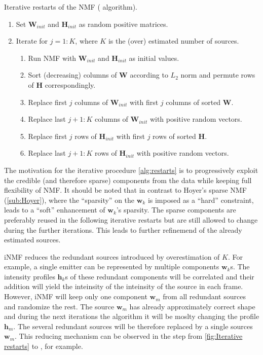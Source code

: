 \begin{algorithm}[hbt]
	\caption{Iterative restarts of the NMF (\inmf{} algorithm).}	
	\label{alg:restarts}
	\begin{enumerate}
		\item Set $\bm{W}_{init}$ and $\bm{H}_{init}$ as random positive matrices.
		\item Iterate for $j=1:K$, where $K$ is the (over) estimated number of sources.
		\begin{enumerate}
			\item Run NMF with $\bm{W}_{init}$ and $\bm{H}_{init}$ as initial values.
			\item Sort (decreasing) columns of $\bm{W}$ according to  $L_2$ norm and permute rows of $\bm{H}$ correspondingly.
			\item Replace first $j$ columns of $\bm{W}_{init}$ with first $j$ columns of sorted $\bm{W}$.
			\item Replace last $j+1:K$ columns of $\bm{W}_{init}$ with positive random vectors.
			\item Replace first $j$ rows of $\bm{H}_{init}$ with first $j$ rows of sorted $\bm{H}$.
			\item Replace last $j+1:K$ rows of $\bm{H}_{init}$ with positive random vectors.
		\end{enumerate}
	\end{enumerate}    
\end{algorithm}

The motivation for the iterative procedure \autoref{alg:restarts} is to progressively exploit the credible (and therefore sparse) components from the data while keeping full flexibility of NMF. It should be noted that in contrast to Hoyer's sparse NMF (\autoref{sub:Hoyer}), where the ``sparsity'' on the $\bm{w}_k$ is imposed as a ``hard'' constraint, \inmf{} leads to a ``soft'' enhancement of $\bm{w}_k$'s sparsity. The sparse components are preferably reused in the following iterative restarts but are still allowed to change during the further iterations. This leads to further refinemend of the already estimated sources. 

iNMF reduces the redundant sources introduced by overestimation of $K$. For example, a single emitter can be represented by multiple components $\bm{w}_k$s. The intensity profiles $\bm{h}_k$s of these redundant components will be correlated and their addition will yield the inteinsity of the inteinsity of the source in each frame. However, iNMF will keep only one component $\bm{w}_m$ from all redundant sources and randomize the rest. The source $\bm{w}_m$ has already approximately correct shape and during the next iterations the algorithm it will be moslty changing the profile $\bm{h}_m$. The several redundant sources will be therefore replaced by a single sources $\bm{w}_m$. This reducing mechanism can be observed in the step from \autoref{fig:Iterative restarts}\bbb{} to \ccc{}, for example.  

